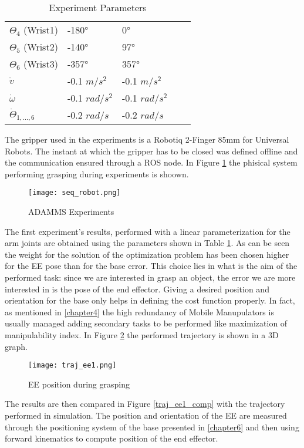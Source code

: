 \begin{table}[h]
\begin{tabular}{|l|l|l|ll}
	$\Theta_4$ (Wrist1) 		&  -180° 						&  0°		 			\\ \cline{1-3}
	$\Theta_5$ (Wrist2)			&  -140° 						&  97°		 			\\ \cline{1-3} 
	$\Theta_6$ (Wrist3) 		&  -357° 						&  357°		 			\\ \cline{1-3}
	$\dot{v}$ 			 		&  -0.1 $m/s^2$					&  -0.1 $m/s^2$ 		\\ \cline{1-3}
	$\dot{\omega}$		 		&  -0.1 $rad/s^2$ 				&  -0.1 $rad/s^2$		\\ \cline{1-3}
	$\dot{\Theta}_{1,\dots,6}$	&  -0.2 $rad/s$					&  -0.2 $rad/s$ 		\\ \cline{1-3}
	\end{tabular}
	\caption{Experiment Parameters}
	\label{tableparam1}
	\end{table}
	The gripper used in the experiments is a Robotiq 2-Finger 85mm for Universal Robots. The instant at which the gripper has to be closed was defined offline and the communication ensured through a ROS node. In Figure \ref{seq_robot} the phisical system performing grasping during experiments is shoown.
	\begin{figure}[h!]
	\centering
	\texttt{[image: seq\_robot.png]}
	\caption{ADAMMS Experiments}
	\label{seq_robot}
	\end{figure}
	The first experiment's results, performed with a linear parameterization for the arm joints are obtained using the parameters shown in Table \ref{tableparam1}. As can be seen the weight for the solution of the optimization problem has been chosen higher for the EE pose than for the base error. This choice lies in what is the aim of the performed task: since we are interested in grasp an object, the error we are more interested in is the pose of the end effector. Giving a desired position and orientation for the base only helps in defining the cost function properly. In fact, as mentioned in \ref{chapter4} the high redundancy of Mobile Manupulators is usually managed adding secondary tasks to be performed like maximization of manipulability index. 
	In Figure \ref{traj_ee1} the performed trajectory is shown in a 3D graph. 
	\begin{figure}[h!]
	\centering
	\texttt{[image: traj\_ee1.png]}
	\caption{EE position during grasping}
	\label{traj_ee1}
	\end{figure}
	The results are then compared in Figure \ref{traj_ee1_comp} with the trajectory performed in simulation. The position and orientation of the EE are measured through the positioning system of the base presented in \ref{chapter6} and then using forward kinematics to compute position of the end effector. 
